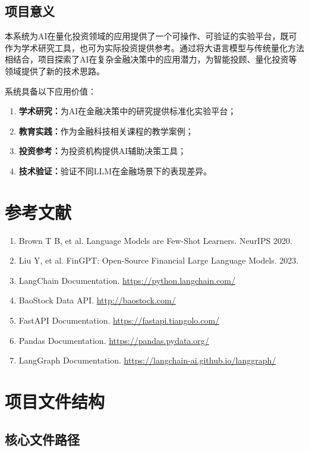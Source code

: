 \documentclass[12pt,a4paper]{ctexart}
\begin{document}
\subsection{项目意义}

本系统为AI在量化投资领域的应用提供了一个可操作、可验证的实验平台，既可作为学术研究工具，也可为实际投资提供参考。通过将大语言模型与传统量化方法相结合，项目探索了AI在复杂金融决策中的应用潜力，为智能投顾、量化投资等领域提供了新的技术思路。

系统具备以下应用价值：
\begin{enumerate}
    \item \textbf{学术研究：}为AI在金融决策中的研究提供标准化实验平台；
    \item \textbf{教育实践：}作为金融科技相关课程的教学案例；
    \item \textbf{投资参考：}为投资机构提供AI辅助决策工具；
    \item \textbf{技术验证：}验证不同LLM在金融场景下的表现差异。
\end{enumerate}

\section*{参考文献}

\begin{enumerate}
    \item Brown T B, et al. Language Models are Few-Shot Learners. NeurIPS 2020.
    \item Liu Y, et al. FinGPT: Open-Source Financial Large Language Models. 2023.
    \item LangChain Documentation. \url{https://python.langchain.com/}
    \item BaoStock Data API. \url{http://baostock.com/}
    \item FastAPI Documentation. \url{https://fastapi.tiangolo.com/}
    \item Pandas Documentation. \url{https://pandas.pydata.org/}
    \item LangGraph Documentation. \url{https://langchain-ai.github.io/langgraph/}
\end{enumerate}

\newpage

\appendix
\section{项目文件结构}

\subsection{核心文件路径}
\end{document}
